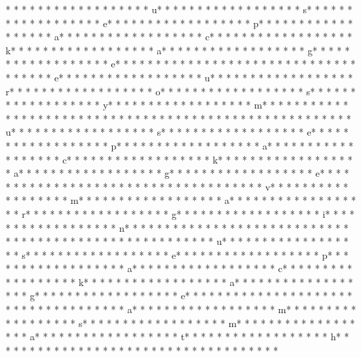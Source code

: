 * * *  * * *  * * *  *  * * *  *  * * *  * u* * *  * * *  * * *  *  * * *  *  * * *  * s* * *  * * *  * * *  *  * * *  *  * * *  * e* * *  * * *  * * *  *  * * *  *  * * *  * p* * *  * * *  * * *  *  * * *  *  * * *  * a* * *  * * *  * * *  *  * * *  *  * * *  * c* * *  * * *  * * *  *  * * *  *  * * *  * k* * *  * * *  * * *  *  * * *  *  * * *  * a* * *  * * *  * * *  *  * * *  *  * * *  * g* * *  * * *  * * *  *  * * *  *  * * *  * e* * *  * * *  * * *  *  * * *  *  * * *  * {* * *  * * *  * * *  *  * * *  *  * * *  * e* * *  * * *  * * *  *  * * *  *  * * *  * u* * *  * * *  * * *  *  * * *  *  * * *  * r* * *  * * *  * * *  *  * * *  *  * * *  * o* * *  * * *  * * *  *  * * *  *  * * *  * s* * *  * * *  * * *  *  * * *  *  * * *  * y* * *  * * *  * * *  *  * * *  *  * * *  * m* * *  * * *  * * *  *  * * *  *  * * *  * }* * *  * * *  * * *  *  * * *  *  * * *  * 
* * *  * * *  * * *  *  * * *  *  * * *  * u* * *  * * *  * * *  *  * * *  *  * * *  * s* * *  * * *  * * *  *  * * *  *  * * *  * e* * *  * * *  * * *  *  * * *  *  * * *  * p* * *  * * *  * * *  *  * * *  *  * * *  * a* * *  * * *  * * *  *  * * *  *  * * *  * c* * *  * * *  * * *  *  * * *  *  * * *  * k* * *  * * *  * * *  *  * * *  *  * * *  * a* * *  * * *  * * *  *  * * *  *  * * *  * g* * *  * * *  * * *  *  * * *  *  * * *  * e* * *  * * *  * * *  *  * * *  *  * * *  * {* * *  * * *  * * *  *  * * *  *  * * *  * v* * *  * * *  * * *  *  * * *  *  * * *  * m* * *  * * *  * * *  *  * * *  *  * * *  * a* * *  * * *  * * *  *  * * *  *  * * *  * r* * *  * * *  * * *  *  * * *  *  * * *  * g* * *  * * *  * * *  *  * * *  *  * * *  * i* * *  * * *  * * *  *  * * *  *  * * *  * n* * *  * * *  * * *  *  * * *  *  * * *  * }* * *  * * *  * * *  *  * * *  *  * * *  * 
* * *  * * *  * * *  *  * * *  *  * * *  * u* * *  * * *  * * *  *  * * *  *  * * *  * s* * *  * * *  * * *  *  * * *  *  * * *  * e* * *  * * *  * * *  *  * * *  *  * * *  * p* * *  * * *  * * *  *  * * *  *  * * *  * a* * *  * * *  * * *  *  * * *  *  * * *  * c* * *  * * *  * * *  *  * * *  *  * * *  * k* * *  * * *  * * *  *  * * *  *  * * *  * a* * *  * * *  * * *  *  * * *  *  * * *  * g* * *  * * *  * * *  *  * * *  *  * * *  * e* * *  * * *  * * *  *  * * *  *  * * *  * {* * *  * * *  * * *  *  * * *  *  * * *  * a* * *  * * *  * * *  *  * * *  *  * * *  * m* * *  * * *  * * *  *  * * *  *  * * *  * s* * *  * * *  * * *  *  * * *  *  * * *  * m* * *  * * *  * * *  *  * * *  *  * * *  * a* * *  * * *  * * *  *  * * *  *  * * *  * t* * *  * * *  * * *  *  * * *  *  * * *  * h* * *  * * *  * * *  *  * * *  *  * * *  * }* * *  * * *  * * *  *  * * *  *  * * *  * 
